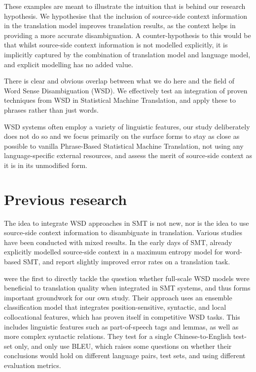 \documentclass[11pt]{article}
\begin{document}
These examples are meant to illustrate the intuition that is behind our
research hypothesis. We hypothesise that the inclusion of source-side context
information in the translation model improves translation results, as the
context helps in providing a more accurate disambiguation. A counter-hypothesis
to this would be that whilst source-side context information is not modelled
explicitly, it is implicitly captured by the combination of translation model
and language model, and explicit modelling has no added value.

There is clear and obvious overlap between what we do here and the field of
Word Sense Disambiguation (WSD). We effectively test an integration of proven
techniques from WSD in Statistical Machine Translation, and apply these to
phrases rather than just words.

WSD systems often employ a variety of linguistic features, our study
deliberately does not do so and we focus primarily on the surface forms to stay
as close as possible to vanilla Phrase-Based Statistical Machine Translation,
not using any language-specific external resources, and assess the merit of
source-side context as it is in its unmodified form. 

\section{Previous research}

The idea to integrate WSD approaches in SMT is not new, nor is the idea to use
source-side context information to disambiguate in translation. Various studies
have been conducted with mixed results. In the early days of SMT,
\cite{GarciaVarea+02} already explicitly modelled source-side context in a
maximum entropy model for word-based SMT, and report slightly improved error
rates on a translation task.

\cite{CarpuatWu05} were the first to
directly tackle the question whether full-scale WSD models were beneficial to translation
quality when integrated in SMT systems, and thus forms important groundwork for
our own study. Their approach uses an ensemble classification model that
integrates position-sensitive, syntactic, and local collocational features,
which has proven itself in competitive WSD tasks. This includes linguistic
features such as part-of-speech tags and lemmas, as well as more complex
syntactic relations. They test for a single Chinese-to-English test-set only, and
only use BLEU, which raises some questions on whether their conclusions would hold
on different language pairs, test sets, and using different evaluation metrics.
\end{document}

